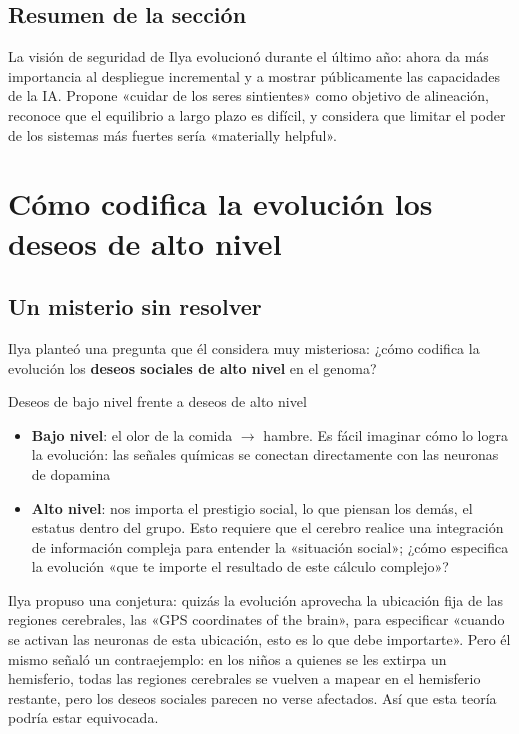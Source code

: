 \documentclass[a4paper]{article}
\begin{document}
\subsection{Resumen de la sección}

La visión de seguridad de Ilya evolucionó durante el último año: ahora da más importancia al despliegue incremental y a mostrar públicamente las capacidades de la IA. Propone «cuidar de los seres sintientes» como objetivo de alineación, reconoce que el equilibrio a largo plazo es difícil, y considera que limitar el poder de los sistemas más fuertes sería «materially helpful».

\section{Cómo codifica la evolución los deseos de alto nivel}

\subsection{Un misterio sin resolver}

Ilya planteó una pregunta que él considera muy misteriosa: ¿cómo codifica la evolución los \textbf{deseos sociales de alto nivel} en el genoma?

\begin{knowledgebox}{Deseos de bajo nivel frente a deseos de alto nivel}
\begin{itemize}
    \item \textbf{Bajo nivel}: el olor de la comida $\rightarrow$ hambre. Es fácil imaginar cómo lo logra la evolución: las señales químicas se conectan directamente con las neuronas de dopamina
    \item \textbf{Alto nivel}: nos importa el prestigio social, lo que piensan los demás, el estatus dentro del grupo. Esto requiere que el cerebro realice una integración de información compleja para entender la «situación social»; ¿cómo especifica la evolución «que te importe el resultado de este cálculo complejo»?
\end{itemize}
\end{knowledgebox}

Ilya propuso una conjetura: quizás la evolución aprovecha la ubicación fija de las regiones cerebrales, las «GPS coordinates of the brain», para especificar «cuando se activan las neuronas de esta ubicación, esto es lo que debe importarte». Pero él mismo señaló un contraejemplo: en los niños a quienes se les extirpa un hemisferio, todas las regiones cerebrales se vuelven a mapear en el hemisferio restante, pero los deseos sociales parecen no verse afectados. Así que esta teoría podría estar equivocada.
\end{document}
